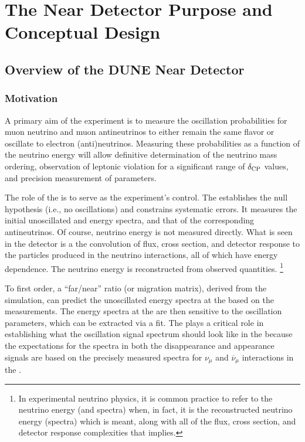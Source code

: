\appendix

\chapter{The Near Detector Purpose and Conceptual Design}
\label{ch:appx-nd}

\section{Overview of the DUNE Near Detector}
\label{sec:appx-nd-overview}

\subsection{Motivation} %
\label{sec:appx-nd:BriefOverview-need}

A primary aim of the  experiment is to measure the oscillation probabilities for muon neutrino and muon antineutrinos to either remain the same flavor or oscillate to electron (anti)neutrinos. 
Measuring these probabilities as a function of the neutrino energy will allow definitive determination of the neutrino mass ordering, observation of leptonic  violation for a significant range of $\delta_{\rm{CP}}$ values, and precision measurement of  parameters.

The role of the  is to serve as the experiment's control. The  establishes the null hypothesis (i.e., no oscillations) and constrains systematic errors. It measures the initial unoscillated \numu and \nue energy spectra, and that of the corresponding antineutrinos.  Of course, neutrino energy is not measured directly.  What is seen in the detector is a the convolution of flux, cross section, and detector response to the particles produced in the neutrino interactions, all of which have energy dependence. The neutrino energy is reconstructed from observed quantities.  \footnote{In experimental neutrino physics, it is common practice to refer to the neutrino energy (and spectra) when, in fact, it is the reconstructed neutrino energy (spectra) which is meant, along with all of the flux, cross section, and detector response complexities that implies.} 

To first order, a ``far/near'' ratio (or migration matrix), derived from the simulation, can predict the unoscillated energy spectra at the  based on the  measurements.  The energy spectra at the  are then sensitive to the oscillation parameters, which can be extracted via a fit.  The  plays a critical role in establishing what the oscillation signal spectrum should look like in the  because the expectations for the spectra in both the disappearance and appearance signals are based on the precisely measured spectra for $\nu_{\mu}$ and $\overline{\nu}_{\mu}$ interactions in the .

